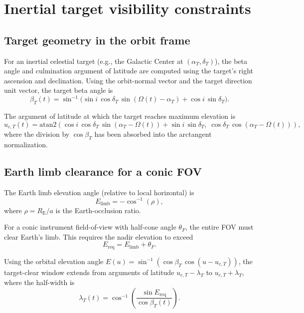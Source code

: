 \documentclass[preprint,12pt]{elsarticle}
\newcommand{\Rearth}{R_{\mathrm{E}}}
\theoremstyle{definition}
\theoremstyle{remark}
\begin{document}
\section{Inertial target visibility constraints}

\subsection{Target geometry in the orbit frame}

For an inertial celestial target (e.g., the Galactic Center at $(\alpha_T,\delta_T)$), the beta angle and culmination argument of latitude are computed using the target's right ascension and declination.
Using the orbit-normal vector and the target direction unit vector, the target beta angle is
\begin{equation}
\beta_T(t) = \sin^{-1}\!\big(\sin i\,\cos\delta_T\,\sin(\Omega(t)-\alpha_T)+\cos i\,\sin\delta_T\big).
\label{eq:beta_target}
\end{equation}

The argument of latitude at which the target reaches maximum elevation is
\begin{equation}
u_{c,T}(t)=\mathrm{atan2}\!\left(
\cos i\,\cos\delta_T\,\sin(\alpha_T-\Omega(t))+\sin i\,\sin\delta_T,\;
\cos\delta_T\,\cos(\alpha_T-\Omega(t))
\right),
\label{eq:uc_target}
\end{equation}
where the division by $\cos\beta_T$ has been absorbed into the arctangent normalization.

\subsection{Earth limb clearance for a conic FOV}

The Earth limb elevation angle (relative to local horizontal) is
\begin{equation}
E_{\mathrm{limb}}=-\cos^{-1}(\rho),
\label{eq:elim_target}
\end{equation}
where $\rho=\Rearth/a$ is the Earth-occlusion ratio.

For a conic instrument field-of-view with half-cone angle $\theta_F$, the entire FOV must clear Earth's limb.
This requires the nadir elevation to exceed
\begin{equation}
E_{\mathrm{req}}=E_{\mathrm{limb}}+\theta_F.
\label{eq:ereq_target}
\end{equation}

Using the orbital elevation angle $E(u)=\sin^{-1}(\cos\beta_T\,\cos(u-u_{c,T}))$, the target-clear window extends from arguments of latitude $u_{c,T}-\lambda_T$ to $u_{c,T}+\lambda_T$, where the half-width is
\begin{equation}
\lambda_T(t)=\cos^{-1}\!\left(\frac{\sin E_{\mathrm{req}}}{\cos\beta_T(t)}\right).
\label{eq:lambda_target_final}
\end{equation}
\end{document}
